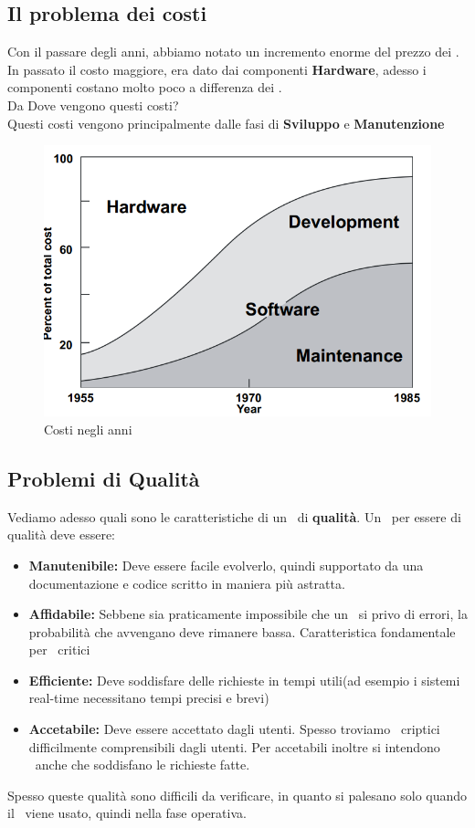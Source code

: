 \subsection{Il problema dei costi}
Con il passare degli anni, abbiamo notato un incremento enorme del prezzo dei \Sw.
\\
In passato il costo maggiore, era dato dai componenti \textbf{Hardware}, adesso i componenti
costano molto poco a differenza dei \Sw.
\\
Da Dove vengono questi costi?
\\
Questi costi vengono principalmente dalle fasi di \textbf{Sviluppo} e \textbf{Manutenzione}
\begin{figure}[htbp]
    \centering
    \includegraphics[scale=0.5]{costi.PNG}   
    \caption{Costi negli anni}
    \label{fig:costi}
\end{figure}
\newpage
\subsection{Problemi di Qualit\`a}
Vediamo adesso quali sono le caratteristiche di un \sw\ di \textbf{qualit\`a}.
Un \sw\ per essere di qualit\`a deve essere:
\begin{itemize}
    \item \textbf{Manutenibile:} Deve essere facile evolverlo, quindi supportato da una documentazione e codice scritto in maniera pi\`u astratta.
    \item \textbf{Affidabile:} Sebbene sia praticamente impossibile che un \sw\ si privo di errori, la probabilit\`a che avvengano deve rimanere bassa. Caratteristica fondamentale per \Sw\ critici
    \item \textbf{Efficiente:} Deve soddisfare delle richieste in tempi utili(ad esempio i sistemi real-time necessitano tempi precisi e brevi)
    \item \textbf{Accetabile:} Deve essere accettato dagli utenti. Spesso troviamo \sw\ criptici difficilmente comprensibili dagli utenti. Per accetabili inoltre si intendono \sw\ anche che soddisfano le richieste fatte.
\end{itemize}
Spesso queste qualit\`a sono difficili da verificare, in quanto si palesano solo quando il \sw\ viene usato, quindi nella fase operativa.

